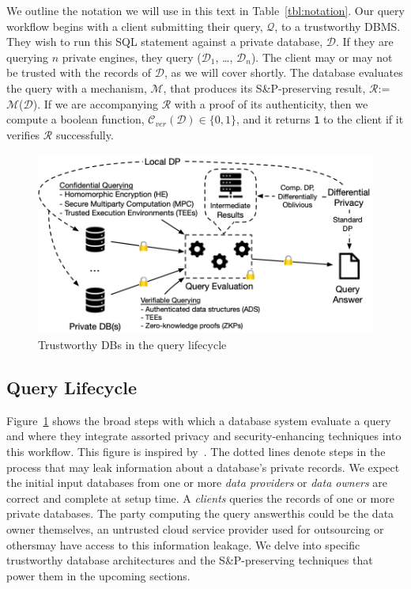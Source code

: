 \documentclass[11pt]{article}
\newcommand{\shortsection}[1]{\vspace{0.2em}\noindent {\bf #1.}}
\newcommand{\mechanism}{$\mathcal{M}$\xspace}
\newcommand{\db}{$\mathcal{D}$\xspace}
\newcommand{\answer}{$\mathcal{R}$\xspace}
\newcommand{\query}{$\mathcal{Q}$\xspace}
\newcommand{\sandp}{S\&P\xspace}
\begin{document}
\shortsection{Notation}  We outline the notation we will use in this text in Table~\ref{tbl:notation}.  Our query workflow begins with a client submitting their query, \query, to a trustworthy DBMS.  They wish to run this SQL statement against a private database, \db.  If they are querying $n$ private engines, they query ($\mathcal{D}_1$, \ldots, $\mathcal{D}_n$).  The client may or may not be trusted with the records of \db, as we will cover shortly.   The database evaluates the query with a mechanism, \mechanism, that produces its \sandp-preserving result, \answer := \mechanism(\db).  If we are accompanying \answer with a proof of its authenticity, then we compute a boolean function, $\mathcal{C}_{ver}(\mathcal{D}) \in \{0, 1\}$, and it returns {\tt 1} to the client if it verifies \answer successfully.



\begin{figure}
\vspace{-4mm}
\centering
    \includegraphics[bb = 0 0 220 118]{submissions/submission1/figs/pets-workflow.png}
        \caption{ Trustworthy DBs  in the query lifecycle}
    \label{fig:pets-workflow}
\end{figure}




\subsection{Query Lifecycle}

Figure~\ref{fig:pets-workflow} shows the broad steps with which a database system  evaluate a query and where they integrate assorted privacy and security-enhancing techniques into this workflow.  This figure is inspired by~\cite{secretflow2024survey}.  The dotted lines denote steps in the process that may leak information about a database's private records.  We expect  the initial input databases from one or more {\em data providers} or {\em data owners} are correct and complete at setup time.  A {\em clients} queries the records of one or more private databases.  The party computing the query answer\textendash this could be the data owner themselves, an untrusted cloud service provider used for outsourcing or others\textendash may have access to this information leakage.   We delve into specific trustworthy database architectures and the \sandp-preserving techniques that power them in the upcoming sections.    
\end{document}

